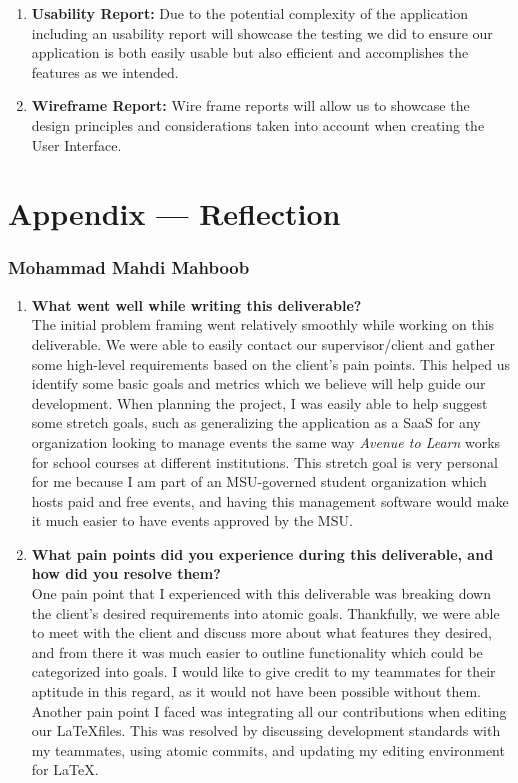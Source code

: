 \documentclass{article}
\begin{document}
\begin{enumerate}
    \item \textbf{Usability Report:} Due to the potential complexity of the application including an usability report will showcase the testing we did to ensure our application is both easily usable but also efficient and accomplishes the features as we intended.
    \item \textbf{Wireframe Report:} Wire frame reports will allow us to showcase the design principles and considerations taken into account when creating the User Interface.
\end{enumerate}

\newpage{}

\section*{Appendix --- Reflection}

\subsubsection*{Mohammad Mahdi Mahboob}
\begin{enumerate}
    \item \textbf{What went well while writing this deliverable? } \\
        The initial problem framing went relatively smoothly while working on this deliverable. We were able to easily
        contact our supervisor/client and gather some high-level requirements based on the client's pain points.
        This helped us identify some basic goals and metrics which we believe will help guide our development.
        When planning the project, I was easily able to help suggest some stretch goals, such as generalizing the
        application as a SaaS for any organization looking to manage events the same way \textit{Avenue to Learn}
        works for school courses at different institutions. This stretch goal is very personal for me because I
        am part of an MSU-governed student organization which hosts paid and free events, and having this management
        software would make it much easier to have events approved by the MSU.
    \item \textbf{What pain points did you experience during this deliverable, and how did you resolve them?} \\
        One pain point that I experienced with this deliverable was breaking down the client's desired requirements
        into atomic goals. Thankfully, we were able to meet with the client and discuss more about what features
        they desired, and from there it was much easier to outline functionality which could be categorized into
        goals. I would like to give credit to my teammates for their aptitude in this regard, as it would not have
        been possible without them. \\
        Another pain point I faced was integrating all our contributions when editing our \LaTeX files. This was
        resolved by discussing development standards with my teammates, using atomic commits, and updating my
        editing environment for \LaTeX.
\end{enumerate}
\end{document}
